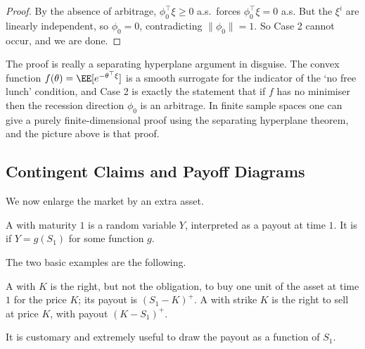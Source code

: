 \begin{proof}
	By the absence of arbitrage, $\phi_0^\top\xi \geq 0$ a.s.\ forces $\phi_0^\top \xi = 0$ a.s. But the $\xi^i$ are linearly independent, so $\phi_0 = 0$, contradicting $\|\phi_0\| = 1$. So Case 2 cannot occur, and we are done.
\end{proof}

\begin{remark}
	The proof is really a separating hyperplane argument in disguise. The convex function $f(\theta) = \EE[e^{-\theta^\top\xi}]$ is a smooth surrogate for the indicator of the `no free lunch' condition, and Case 2 is exactly the statement that if $f$ has no minimiser then the recession direction $\phi_0$ is an arbitrage. In finite sample spaces one can give a purely finite-dimensional proof using the separating hyperplane theorem, and the picture above is that proof.
\end{remark}

\subsection{Contingent Claims and Payoff Diagrams}

We now enlarge the market by an extra asset.

\begin{definition}
	A  with maturity $1$ is a random variable $Y$, interpreted as a payout at time $1$. It is  if $Y = g(S_1)$ for some function $g$.
\end{definition}

The two basic examples are the following.

\begin{definition}
	A  with  $K$ is the right, but not the obligation, to buy one unit of the asset at time $1$ for the price $K$; its payout is $(S_1-K)^+$. A  with strike $K$ is the right to sell at price $K$, with payout $(K - S_1)^+$.
\end{definition}

It is customary and extremely useful to draw the payout as a function of $S_1$.

